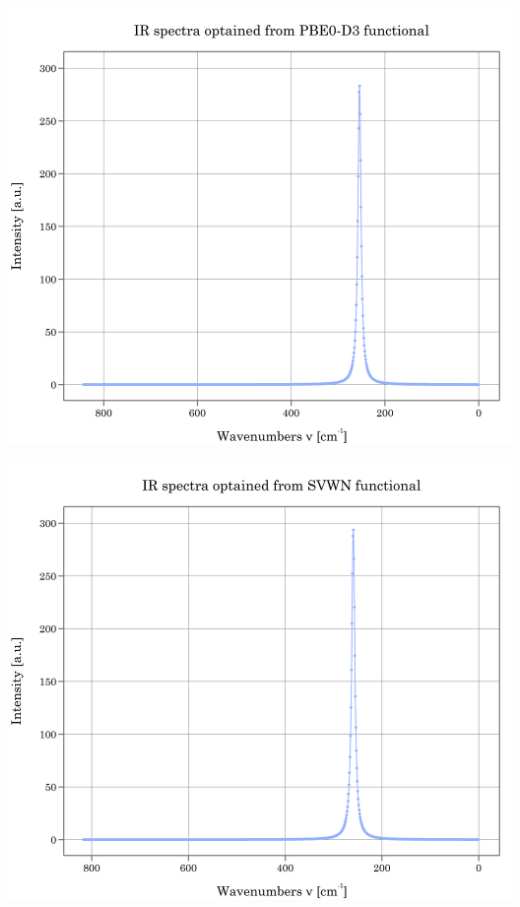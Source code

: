 \documentclass{article}
\begin{document}
\noindent\begin{minipage}{0.45\textwidth}
	\centering
	\includegraphics[width=1\textwidth]{../images/IR/IR_PBE0_D3.png}
	\label{fig:VIBRATIONAL_PBE0D3}
\end{minipage}
\hfill
\begin{minipage}{0.45\textwidth}
	\centering
	\includegraphics[width=1\textwidth]{../images/IR/IR_SVWN.png}
	\label{fig:VIBRATIONAL_SVWN}
\end{minipage}
\end{document}
